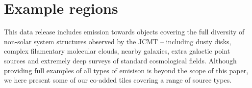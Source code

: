 \documentclass[twocolumn,times]{aastex6}
\begin{document}
\section{Example regions}
This data release includes emission towards objects covering the full
diversity of non-solar system structures observed by the JCMT --
including dusty disks, complex filamentary molecular clouds, nearby
galaxies, extra galactic point sources and extremely deep surveys of
standard cosmological fields. Although providing full examples of all
types of emisison is beyond the scope of this paper, we here present
some of our co-added tiles covering a range of source types.
\end{document}
